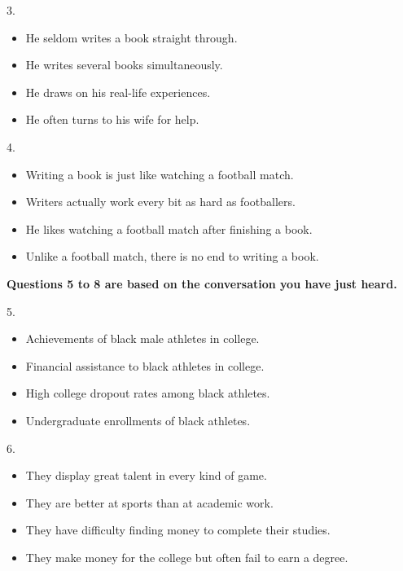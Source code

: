 \documentclass[UTF8,11pt]{ctexart}
\begin{document}
3.


\begin{itemize}[leftmargin=2em,itemsep=.2em,topsep=.4em]\item[A.] He seldom writes a book straight through.
\item[B.] He writes several books simultaneously.
\item[C.] He draws on his real-life experiences.
\item[D.] He often turns to his wife for help.
\end{itemize}

4.


\begin{itemize}[leftmargin=2em,itemsep=.2em,topsep=.4em]\item[A.] Writing a book is just like watching a football match.
\item[B.] Writers actually work every bit as hard as footballers.
\item[C.] He likes watching a football match after finishing a book.
\item[D.] Unlike a football match, there is no end to writing a book.
\end{itemize}

\textbf{Questions 5 to 8 are based on the conversation you have just heard.}


5.


\begin{itemize}[leftmargin=2em,itemsep=.2em,topsep=.4em]\item[A.] Achievements of black male athletes in college.
\item[B.] Financial assistance to black athletes in college.
\item[C.] High college dropout rates among black athletes.
\item[D.] Undergraduate enrollments of black athletes.
\end{itemize}

6.


\begin{itemize}[leftmargin=2em,itemsep=.2em,topsep=.4em]\item[A.] They display great talent in every kind of game.
\item[B.] They are better at sports than at academic work.
\item[C.] They have difficulty finding money to complete their studies.
\item[D.] They make money for the college but often fail to earn a degree.
\end{itemize}
\end{document}
